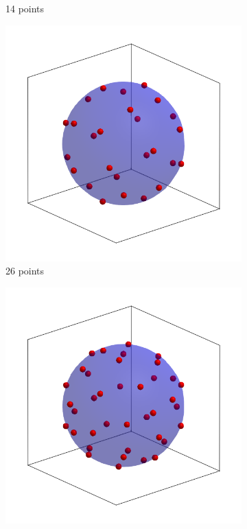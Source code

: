 \documentclass[main.tex]{subfiles}
\begin{document}
\begin{figure}
\begin{subfigure}{0.2\linewidth}
		\caption{14 points}
	\end{subfigure}\hfill%
	\begin{subfigure}{0.2\linewidth}
		\centering
		\includegraphics[width=\linewidth]{figures/gcmc/lebedev_26}
		\caption{26 points}
	\end{subfigure}\hfill%
	\begin{subfigure}{0.2\linewidth}
		\centering
		\includegraphics[width=\linewidth]{figures/gcmc/lebedev_38}

\end{subfigure}
\end{figure}
\end{document}
